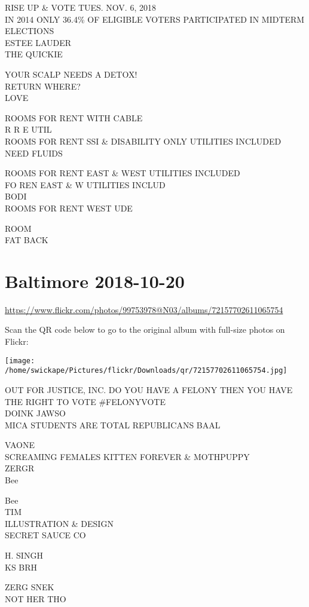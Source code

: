 \documentclass[10pt,letterpaper]{article}
\begin{document}
RISE UP \& VOTE TUES. NOV. 6, 2018\\
IN 2014 ONLY 36.4\% OF ELIGIBLE VOTERS PARTICIPATED IN MIDTERM ELECTIONS\\
ESTEE LAUDER\\
THE QUICKIE

YOUR SCALP NEEDS A DETOX!\\
RETURN WHERE?\\
LOVE

ROOMS FOR RENT WITH CABLE\\
R R E UTIL\\
ROOMS FOR RENT SSI \& DISABILITY ONLY UTILITIES INCLUDED\\
NEED FLUIDS

ROOMS FOR RENT EAST \& WEST UTILITIES INCLUDED\\
FO REN EAST \& W UTILITIES INCLUD\\
BODI\\
ROOMS FOR RENT WEST UDE

ROOM\\
FAT BACK


\section*{Baltimore 2018-10-20}

\url{https://www.flickr.com/photos/99753978@N03/albums/72157702611065754}

Scan the QR code below to go to the original album with full-size photos on Flickr:

\texttt{[image: /home/swickape/Pictures/flickr/Downloads/qr/72157702611065754.jpg]}


OUT FOR JUSTICE, INC. DO YOU HAVE A FELONY THEN YOU HAVE THE RIGHT TO VOTE \#FELONYVOTE\\
DOINK JAWSO\\
MICA STUDENTS ARE TOTAL REPUBLICANS BAAL

VAONE\\
SCREAMING FEMALES KITTEN FOREVER \& MOTHPUPPY\\
ZERGR\\
Bee

Bee\\
TIM\\
ILLUSTRATION \& DESIGN\\
SECRET SAUCE CO

H. SINGH\\
KS BRH

ZERG SNEK\\
NOT HER THO
\end{document}
